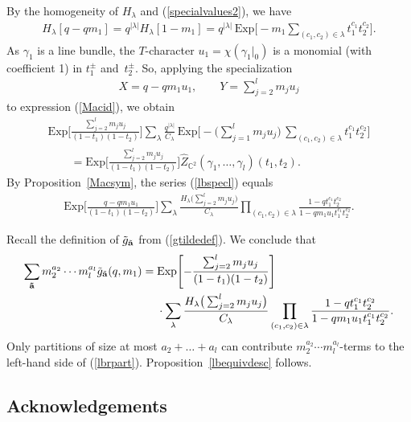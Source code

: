 \documentclass[pdftex]{sigma}
\numberwithin{equation}{section}
\newcommand{\Exp}{\mathrm{Exp}}
\def\C{\mathbb C}
\begin{document}
By the homogeneity of $H_{\lambda}$ and (\ref{specialvalues2}), we have
\begin{gather*}
H_{\lambda}[q-qm_1]=q^{|\lambda|}H_{\lambda}[1-m_1]=q^{|\lambda|}\,
\Exp\biggl[-m_1\sum_{(c_1,c_2)\in\lambda}t_1^{c_1}t_2^{c_2}\biggr].
\end{gather*}
As $\gamma_1$ is a line bundle, the $T$-character $u_1=\chi(\gamma_1|_0)$ is a monomial (with coefficient 1) in $t_1^{\pm}$ and~$t_2^{\pm}$. So, applying the specialization
\begin{gather*}
X=q-qm_1u_1, \qquad Y=\sum_{j=2}^{l} m_ju_j
\end{gather*}
to expression (\ref{Macid}), we obtain
{\samepage\begin{gather}\nonumber
\Exp\Bigg[\frac{\sum_{j=2}^{l} m_ju_j}{(1-t_1)(1-t_2)}\Bigg]\sum_{\lambda} \frac{q^{|\lambda|}}{C_{\lambda}}\,\Exp\Biggl[-\bigg(\sum_{j=1}^{l} m_ju_j\bigg)\, \sum_{(c_1,c_2)\in \lambda} t_1^{c_1}t_2^{c_2} \Biggr]
\\ \qquad
{} = \Exp\Bigg[\frac{\sum_{j=2}^{l} m_ju_j}{(1-t_1)(1-t_2)}\Bigg]\hat{Z}_{\C^2}(\gamma_1,\dots,\gamma_l)(t_1,t_2) .\label{lbspecl}
\end{gather}}%
By Proposition~\ref{Macsym}, the series (\ref{lbspecl}) equals
\begin{align*}
\Exp\bigg[\frac{q-qm_1u_1}{(1-t_1)(1-t_2)}\bigg] \sum_{\lambda} \frac{H_{\lambda} \big(\sum_{j=2}^{l} m_ju_j\big)}{C_{\lambda}} \prod_{(c_1,c_2)\in \lambda} \frac{1-qt_1^{c_1}t_2^{c_2}}{1-qm_1u_1t_1^{c_1}t_2^{c_2}}.
\end{align*}

Recall the definition of $\tilde{g}_{\tilde{\bf{a}}}$ from (\ref{gtildedef}). We conclude that
\begin{align}\nonumber
\sum_{\bf{\tilde{a}}} m_2^{a_2}\cdots m_l^{a_l} \tilde{g}_{\tilde{\bf{a}}}(q,m_1)
={}&\Exp\Biggl[-\frac{\sum_{j=2}^{l} m_ju_j}{(1-t_1)(1-t_2)}\Biggr]
\\
&{}\cdot \sum_{\lambda} \frac{H_{\lambda} \big(\sum_{j=2}^{l} m_ju_j\big)}{C_{\lambda}} \prod_{(c_1,c_2)\in \lambda} \frac{1-qt_1^{c_1}t_2^{c_2}}{1-qm_1u_1t_1^{c_1}t_2^{c_2}}.
\label{lbrpart}
\end{align}
Only partitions of size at most $a_2+\dots+a_l$ can contribute $m_2^{a_2}\cdots m_l^{a_l}$-terms to the left-hand side of (\ref{lbrpart}). Proposition~\ref{lbequivdesc} follows.

\subsection*{Acknowledgements}
\end{document}
